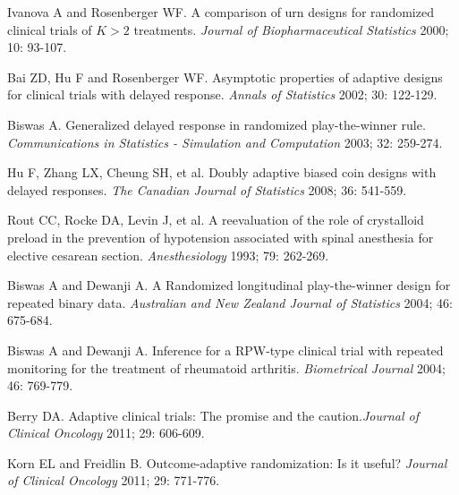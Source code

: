 \begin{thebibliography}
 Ivanova A and Rosenberger WF. A comparison of urn designs for randomized clinical trials of $K>2$ treatments. \textit{Journal of Biopharmaceutical Statistics} 2000; 10: 93-107.

 Bai ZD, Hu F and Rosenberger WF.  Asymptotic properties of adaptive designs for clinical trials with delayed response. \textit{Annals of Statistics} 2002; 30: 122-129.

 Biswas A. Generalized delayed response in randomized play-the-winner rule. \textit{Communications in Statistics - Simulation and Computation} 2003; 32: 259-274.

 Hu F,  Zhang LX, Cheung SH, et al. Doubly adaptive biased coin designs with delayed responses.  \textit{The Canadian Journal of Statistics} 2008; 36: 541-559.

 Rout CC, Rocke DA, Levin J, et al.  A reevaluation of the role of crystalloid preload in the prevention of hypotension associated with spinal anesthesia for elective cesarean section. \textit{Anesthesiology} 1993; 79: 262-269.

 Biswas A and Dewanji A. A Randomized longitudinal play-the-winner design for repeated binary data. \textit{Australian and New Zealand Journal of Statistics} 2004; 46: 675-684.

 Biswas A and Dewanji A. Inference for a RPW-type clinical trial with repeated monitoring for the treatment of rheumatoid arthritis. \textit{Biometrical Journal} 2004; 46: 769-779.

 Berry DA. Adaptive clinical trials: The promise and the caution.\textit{Journal of  Clinical Oncology} 2011; 29: 606-609.

 Korn EL and Freidlin B. Outcome-adaptive randomization: Is it useful? \textit{Journal of  Clinical Oncology} 2011; 29: 771-776.

\end{thebibliography}


